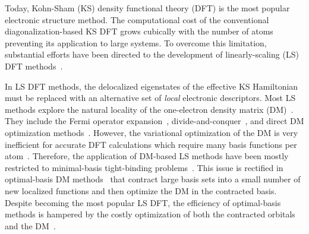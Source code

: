 \documentclass[aps,prl,twocolumn,reprint,amsmath,amssymb]{revtex4-1}
\begin{document}

Today, Kohn-Sham (KS) density functional theory (DFT) is the most popular electronic structure method. 
The computational cost of the conventional diagonalization-based KS DFT grows cubically with the number of atoms preventing its application to large systems. 
To overcome this limitation, substantial efforts have been directed to the development of linearly-scaling (LS) DFT methods~\cite{goedecker1999linear,bowler2012methods}. 

In LS DFT methods, the delocalized eigenstates of the effective KS Hamiltonian must be replaced with an alternative set of \emph{local} electronic descriptors. 
Most LS methods explore the natural locality of the one-electron density matrix (DM)~\cite{li1993density, lee1996linear, li2003density, vandevondele2012linear, Kussmann2013, Aarons2016, shao2003curvy}.  
They include the Fermi operator expansion~\cite{goedecker1994efficient,goedecker1995tight}, divide-and-conquer~\cite{yang1991direct,yang1991local}, and direct DM optimization methods~\cite{li1993density, shao2003curvy, vandevondele2012linear}. 
However, the variational optimization of the DM is very inefficient for accurate DFT calculations which require many basis functions per atom~\cite{goedecker1999linear,a:ls-dm-sign, Arita2014, a:ls-rev-2012, a:almo-ls}.
Therefore, the application of DM-based LS methods have been mostly restricted to minimal-basis tight-binding problems~\cite{Richters2014, example-of-a-large-scale-tight-binding}. 
This issue is rectified in optimal-basis DM methods~\cite{Skylaris2005, Nakata2015, Mohr2015} that contract large basis sets into a small number of new localized functions and then optimize the DM in the contracted basis. 
Despite becoming the most popular LS DFT, the efficiency of optimal-basis methods is hampered by the costly optimization of both the contracted orbitals and the DM~\cite{a:ls-onetep-2003}.
\end{document}
